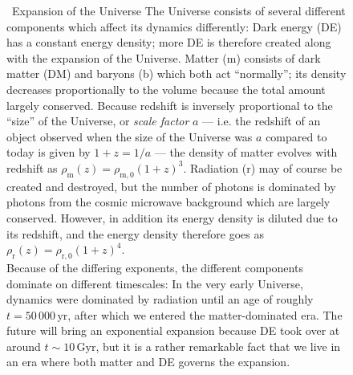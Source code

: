 \documentclass[useAMS]{aa}
\begin{document}
\begin{figure}[!t]
\begin{bclogo}[
    couleur=gray!20,
    epBord=1,
    arrondi=0.1,
    logo=\bcinfo,
    marge=8,
    ombre=false, %
    couleurBord=gray!60,
    barre=line]
    { \ \textsf{Expansion of the Universe}}
    \small{\textsf{
        The Universe consists of several different components which affect its dynamics differently:
        Dark energy (DE) has a constant energy density; more DE is therefore created along with the expansion of the Universe.
        Matter (m) consists of dark matter (DM) and baryons (b) which both act ``normally''; its density decreases proportionally to the volume because the total amount largely conserved. Because redshift is inversely proportional to the ``size'' of the Universe, or \emph{scale factor} $a$ --- i.e. the redshift of an object observed when the size of the Universe was $a$ compared to today is given by $1+z=1/a$ --- the density of matter evolves with redshift as
        $\rho_\mathrm{m}(z) = \rho_\mathrm{m,0} (1+z)^3$.
        Radiation (r) may of course be created and destroyed, but the number of photons is dominated by photons from the cosmic microwave background which are largely conserved. However, in addition its energy density is diluted due to its redshift, and the energy density therefore goes as
        $\rho_\mathrm{r}(z) = \rho_\mathrm{r,0} (1+z)^4$.\vspace{1mm}\\
        Because of the differing exponents, the different components dominate on different timescales:
        In the very early Universe, dynamics were dominated by radiation until an age of roughly $t = 50\,000\,\mathrm{yr}$, after which we entered the matter-dominated era.
        The future will bring an exponential expansion because DE took over at around $t\sim10\,\mathrm{Gyr}$, but it is a rather remarkable fact that we live in an era where both matter and DE governs the expansion.
    }}
\label{info:expansion}
\end{bclogo}
     \endminipage
\end{figure}
\end{document}

